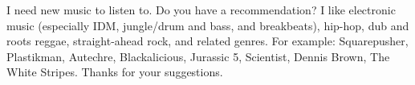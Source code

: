 \documentclass[12pt]{exam}
\begin{document}
\begin{questions}
\begin{parts}

\end{parts}

\bonusquestion[4] I need new music to listen to. Do you have a recommendation? I like electronic music (especially IDM, jungle/drum and bass, and breakbeats), hip-hop, dub and roots reggae, straight-ahead rock, and related genres. For example: Squarepusher, Plastikman, Autechre, Blackalicious, Jurassic 5, Scientist, Dennis Brown, The White Stripes. Thanks for your suggestions.


\end{questions}
\end{document}

